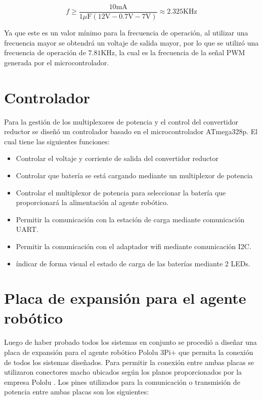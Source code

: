         $$
            f \geq \frac{10\text{mA}}{1\mu\text{F}(12\text{V} - 0.7\text{V}
             - 7\text{V})} \approx 2.325\text{KHz}
        $$

    Ya que este es un valor mínimo para la frecuencia de operación, al utilizar
    una frecuencia mayor se obtendrá un voltaje de salida mayor, por lo que se
    utilizó una frecuencia de operación de $7.81\text{KHz}$, la cual es la
    frecuencia de la señal PWM generada por el microcontrolador. 

    

    \section{Controlador}

    Para la gestión de los multiplexores de potencia y el control del convertidor
    reductor se diseñó un controlador basado en el microcontrolador ATmega328p.
    El cual tiene las siguientes funciones:

    \begin{itemize}
        \item Controlar el voltaje y corriente de salida del convertidor reductor
        \item Controlar que batería se está cargando mediante un multiplexor de potencia
        \item Controlar el multiplexor de potencia para seleccionar la batería
        que proporcionará la alimentación al agente robótico.
        \item Permitir la comunicación con la estación de carga mediante comunicación
        UART.
        \item  Permitir la comunicación con el adaptador wifi mediante comunicación
        I2C.
        \item índicar de forma visual el estado de carga de las baterías mediante
        2 LEDs.
    \end{itemize}


    \section{Placa de expansión para el agente robótico}

        Luego de haber probado todos los sistemas en conjunto se procedió a diseñar
        una placa de expansión para el agente robótico Pololu 3Pi+ que permita
        la conexión de todos los sistemas diseñados. Para permitir la conexión
         entre ambas placas se utilizaron conectores 
        macho ubicados según los planos proporcionados por la 
        empresa Pololu \cite{noauthor_pololu_nodate}.
        Los pines utilizados para la comunicación o transmisión de potencia entre
        ambas placas son los siguientes:

